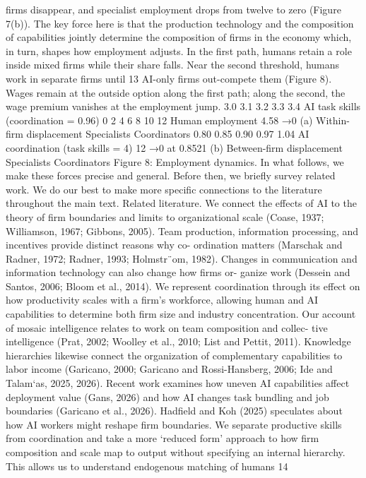 firms disappear, and specialist employment drops from twelve to zero (Figure 7(b)).
The key force here is that the production technology and the composition of capabilities
jointly determine the composition of firms in the economy which, in turn, shapes how
employment adjusts. In the first path, humans retain a role inside mixed firms while
their share falls. Near the second threshold, humans work in separate firms until
13
AI-only firms out-compete them (Figure 8). Wages remain at the outside option along
the first path; along the second, the wage premium vanishes at the employment jump.
3.0
3.1
3.2
3.3
3.4
AI task skills (coordination = 0.96)
0
2
4
6
8
10
12
Human employment
4.58 →0
(a) Within-ﬁrm displacement
Specialists
Coordinators
0.80
0.85
0.90
0.97
1.04
AI coordination (task skills = 4)
12 →0 at 0.8521
(b) Between-ﬁrm displacement
Specialists
Coordinators
Figure 8: Employment dynamics.
In what follows, we make these forces precise and general. Before then, we briefly
survey related work. We do our best to make more specific connections to the literature
throughout the main text.
Related literature. We connect the effects of AI to the theory of firm boundaries and
limits to organizational scale (Coase, 1937; Williamson, 1967; Gibbons, 2005). Team
production, information processing, and incentives provide distinct reasons why co-
ordination matters (Marschak and Radner, 1972; Radner, 1993; Holmstr¨om, 1982).
Changes in communication and information technology can also change how firms or-
ganize work (Dessein and Santos, 2006; Bloom et al., 2014). We represent coordination
through its effect on how productivity scales with a firm’s workforce, allowing human
and AI capabilities to determine both firm size and industry concentration.
Our account of mosaic intelligence relates to work on team composition and collec-
tive intelligence (Prat, 2002; Woolley et al., 2010; List and Pettit, 2011). Knowledge
hierarchies likewise connect the organization of complementary capabilities to labor
income (Garicano, 2000; Garicano and Rossi-Hansberg, 2006; Ide and Talam`as, 2025,
2026). Recent work examines how uneven AI capabilities affect deployment value
(Gans, 2026) and how AI changes task bundling and job boundaries (Garicano et al.,
2026). Hadfield and Koh (2025) speculates about how AI workers might reshape firm
boundaries. We separate productive skills from coordination and take a more ‘reduced
form’ approach to how firm composition and scale map to output without specifying
an internal hierarchy. This allows us to understand endogenous matching of humans
14

